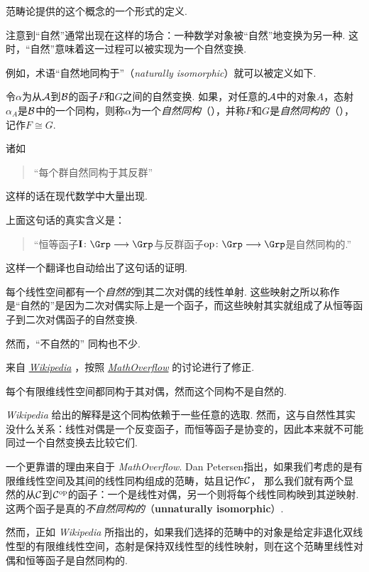   范畴论提供的这个概念的一个形式的定义.

  注意到``自然''通常出现在这样的场合：一种数学对象被``自然''地变换为另一种.
  这时，``自然''意味着这一过程可以被实现为一个自然变换.

  例如，术语``自然地同构于''（\emph{naturally isomorphic}）就可以被定义如下.
  \begin{defn}
    令$\alpha$为从${\cal A}$到${\cal B}$的函子$F$和$G$之间的自然变换.
    如果，对任意的${\cal A}$中的对象$A$，态射$\alpha_A$是${\cal B}$中的一个同构，则称$\alpha$为一个\emph{自然同构}（），并称$F$和$G$是\emph{自然同构的}（），记作$F\cong G$.
  \end{defn}

  \begin{exam}[反群]
    诸如
    \begin{quote}
      ``每个群自然同构于其反群''
    \end{quote}
    这样的话在现代数学中大量出现.

    上面这句话的真实含义是：
    \begin{quote}
      ``恒等函子$\Id \colon \Grp \To \Grp$与反群函子$\op \colon \Grp \To \Grp$是自然同构的.''
    \end{quote}

    这样一个翻译也自动给出了这句话的证明.
  \end{exam}

  \begin{exam}[二次对偶]
    每个线性空间都有一个\emph{自然的}到其二次对偶的线性单射.
    这些映射之所以称作是``自然的''是因为二次对偶实际上是一个函子，而这些映射其实就组成了从恒等函子到二次对偶函子的自然变换.
  \end{exam}

  然而，``不自然的'' 同构也不少.
  \begin{exam}[有限维线性空间之对偶]
  来自
  \href{http://en.wikipedia.org/wiki/Natural_transformation#Example:_dual_of_a_finite-dimensional_vector_space}{\emph{Wikipedia}}
  ，按照
  \href{http://mathoverflow.net/a/139398/43771}{\emph{MathOverflow}}
  的讨论进行了修正.

   每个有限维线性空间都同构于其对偶，然而这个同构不是自然的.

   \emph{Wikipedia} 给出的解释是这个同构依赖于一些任意的选取.
   然而，这与自然性其实没什么关系：线性对偶是一个反变函子，而恒等函子是协变的，因此本来就不可能同过一个自然变换去比较它们.

   一个更靠谱的理由来自于 \emph{MathOverflow}.
   Dan Petersen指出，如果我们考虑的是有限维线性空间及其间的线性同构组成的范畴，姑且记作${\cal C}$， 那么我们就有两个显然的从${\cal C}$到${\cal C}^{\operatorname{op}}$的函子：一个是线性对偶，另一个则将每个线性同构映到其逆映射.
   这两个函子是真的\emph{不自然同构的}（\textbf{unnaturally isomorphic}）.

   然而，正如 \emph{Wikipedia} 所指出的，如果我们选择的范畴中的对象是给定非退化双线性型的有限维线性空间，态射是保持双线性型的线性映射，则在这个范畴里线性对偶和恒等函子是自然同构的.
  \end{exam}

